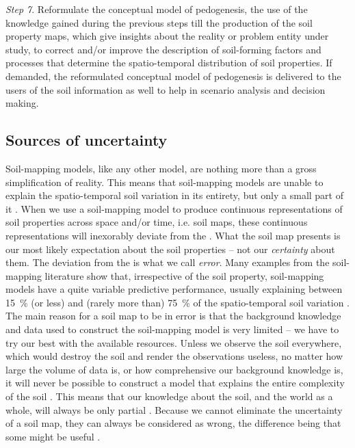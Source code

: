\noindent\textit{Step 7}. Reformulate the conceptual model of pedogenesis, the use
of the knowledge gained during the previous steps till the production of the soil property 
maps, which give insights about the reality or problem entity under study, to correct 
and/or improve the description of soil-forming factors and processes that determine the 
spatio-temporal distribution of soil properties. If demanded, the reformulated conceptual model 
of pedogenesis is delivered to the users of the soil information as well to help in scenario analysis
and decision making.

\subsection{Sources of uncertainty}
\label{sec:intro-uncertainty}

Soil-mapping models, like any other model, are nothing more than a gross simplification of reality.
This means that soil-mapping models are unable to explain the spatio-temporal soil variation in 
its entirety, but only a small part of it \cite{Heuvelink1998a,Legros2006}. When we use a 
soil-mapping model to produce continuous representations of soil properties across space and/or time,
i.e. soil maps, these continuous representations will inexorably deviate from the . What 
the soil map presents is our most likely expectation about the soil properties -- not our 
\emph{certainty} about them. The deviation from the  is what we call \emph{error}. Many
examples from the soil-mapping literature show that, irrespective of the soil property, soil-mapping
models have a quite variable predictive performance, usually explaining between \SI{15}{\percent} 
(or less) and (rarely more than) \SI{75}{\percent} of the spatio-temporal soil variation
\cite{MooreEtAl1993,OdehEtAl1994,GesslerEtAl1995,McKenzieEtAl1999,GobinEtAl2001,SumflethEtAl2008,SunEtAl2012,ViscarraRosselEtAl2013,NussbaumEtAl2014,HenglEtAl2015,GaschEtAl2015,HeungEtAl2016}.
The main reason for a soil map to be in error is that the background knowledge and data used to 
construct the soil-mapping model is very limited -- we have to try our best with the available 
resources. Unless we observe the soil everywhere, which would destroy the soil and render the 
observations useless, no matter how large the volume of data is, or how comprehensive our background
knowledge is, it will never be possible to construct a model that explains the entire complexity of 
the soil \cite{Tukey1997}. This means that our knowledge about the soil, and the world as a whole, 
will always be only partial \cite{Box1993}. Because we cannot eliminate the uncertainty of a soil 
map, they can always be considered as wrong, the difference being that some might be useful 
\cite{Box1976}.

